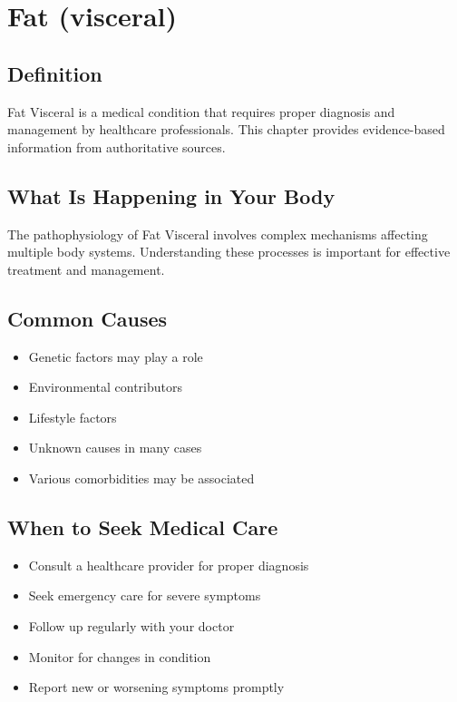 
\chapter{Fat (visceral)}

\section*{Definition}
Fat Visceral is a medical condition that requires proper diagnosis and management by healthcare professionals. This chapter provides evidence-based information from authoritative sources.

\section*{What Is Happening in Your Body}
The pathophysiology of Fat Visceral involves complex mechanisms affecting multiple body systems. Understanding these processes is important for effective treatment and management.

\section*{Common Causes}
\begin{itemize}
  \item Genetic factors may play a role
  \item Environmental contributors
  \item Lifestyle factors
  \item Unknown causes in many cases
  \item Various comorbidities may be associated
\end{itemize}

\section*{When to Seek Medical Care}
\begin{itemize}
  \item Consult a healthcare provider for proper diagnosis
  \item Seek emergency care for severe symptoms
  \item Follow up regularly with your doctor
  \item Monitor for changes in condition
  \item Report new or worsening symptoms promptly
\end{itemize}

